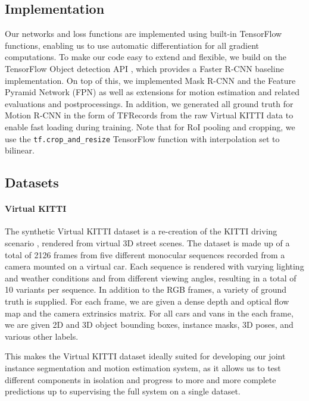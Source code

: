 \subsection{Implementation}
Our networks and loss functions are implemented using built-in TensorFlow \cite{TensorFlow}
functions, enabling us to use automatic differentiation for all gradient
computations. To make our code easy to extend and flexible, we build on
the TensorFlow Object detection API \cite{TensorFlowObjectDetection}, which provides a Faster R-CNN baseline
implementation.
On top of this, we implemented Mask R-CNN and the Feature Pyramid Network (FPN)
as well as extensions for motion estimation and related evaluations
and postprocessings. In addition, we generated all ground truth for
Motion R-CNN in the form of TFRecords from the raw Virtual KITTI
data to enable fast loading during training.
Note that for RoI pooling and cropping,
we use the \texttt{tf.crop\_and\_resize} TensorFlow function with
interpolation set to bilinear.

\subsection{Datasets}

\paragraph{Virtual KITTI}
The synthetic Virtual KITTI dataset \cite{VKITTI} is a re-creation of the KITTI
driving scenario \cite{KITTI2012, KITTI2015}, rendered from virtual 3D street
scenes.
The dataset is made up of a total of 2126 frames from five different monocular
sequences recorded from a camera mounted on a virtual car.
Each sequence is rendered with varying lighting and weather conditions and
from different viewing angles, resulting in a total of 10 variants per sequence.
In addition to the RGB frames, a variety of ground truth is supplied.
For each frame, we are given a dense depth and optical flow map and the camera
extrinsics matrix.
For all cars and vans in the each frame, we are given 2D and 3D object bounding
boxes, instance masks, 3D poses, and various other labels.

This makes the Virtual KITTI dataset ideally suited for developing our joint
instance segmentation and motion estimation system, as it allows us to test
different components in isolation and progress to more and more complete
predictions up to supervising the full system on a single dataset.

